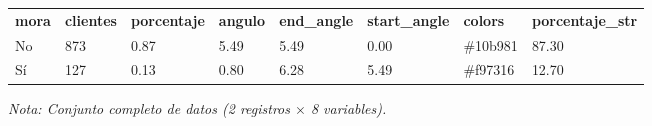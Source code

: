 

\begin{table}[htbp]

\centering

\begin{adjustbox}{max width=\textwidth}

\begin{tabular}{llllllll}

\rowcolor{ThemeBackground}
\rule{0pt}{0.45cm}
\textcolor{ThemeGold}{\bfseries mora} & \textcolor{ThemeGold}{\bfseries clientes} & \textcolor{ThemeGold}{\bfseries porcentaje} & \textcolor{ThemeGold}{\bfseries angulo} & \textcolor{ThemeGold}{\bfseries end\_angle} & \textcolor{ThemeGold}{\bfseries start\_angle} & \textcolor{ThemeGold}{\bfseries colors} & \textcolor{ThemeGold}{\bfseries porcentaje\_str} \\

No & 873 & 0.87 & 5.49 & 5.49 & 0.00 & \#10b981 & 87.30 \\
Sí & 127 & 0.13 & 0.80 & 6.28 & 5.49 & \#f97316 & 12.70 \\
\bottomrule
\end{tabular}

\end{adjustbox}

\vspace{0.15cm}
{\raggedright\sffamily\footnotesize\color{ThemeMuted}
\textit{Nota: Conjunto completo de datos (2 registros $\times$ 8 variables).}}

\end{table}
